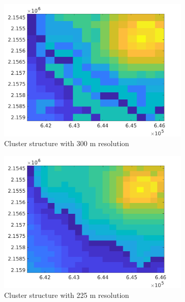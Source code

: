 \begin{figure}[H]
\begin{subfigure}{0.48\textwidth}
\centering
\includegraphics[width=\textwidth]{dem_figs/colima_cluster_300}
\caption{Cluster structure with 300 m resolution}
\label{colima_cluster_300}
\end{subfigure}
\centering
\begin{subfigure}{0.48\textwidth}
\includegraphics[width=\textwidth]{dem_figs/colima_cluster_225}
\caption{Cluster structure with 225 m resolution}
\label{colima_cluster_225}
\end{subfigure} \\
\begin{subfigure}{0.48\textwidth}
\centering

\end{subfigure}
\end{figure}
